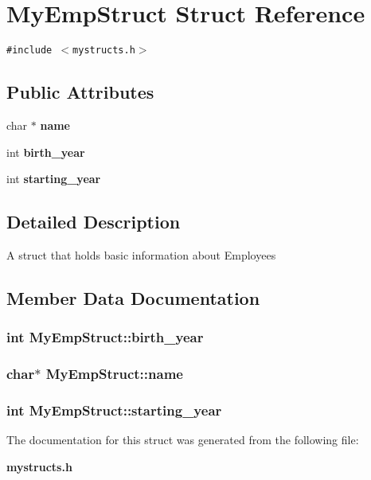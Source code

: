 \section{My\-Emp\-Struct Struct Reference}
\label{structMyEmpStruct}
{\tt \#include $<$mystructs.h$>$}

\subsection*{Public Attributes}
\begin{CompactItemize}
\item 
char $\ast$ \bf{name}
\item 
int \bf{birth\_\-year}
\item 
int \bf{starting\_\-year}
\end{CompactItemize}


\subsection{Detailed Description}
A struct that holds basic information about Employees 



\subsection{Member Data Documentation}
\subsubsection{\setlength{\rightskip}{0pt plus 5cm}int \bf{My\-Emp\-Struct::birth\_\-year}}\label{structMyEmpStruct_522685b85b9f3f784f9c16226c2d92a0}


\subsubsection{\setlength{\rightskip}{0pt plus 5cm}char$\ast$ \bf{My\-Emp\-Struct::name}}\label{structMyEmpStruct_dd70d4f719cdcb89f0560236aebfbbdf}


\subsubsection{\setlength{\rightskip}{0pt plus 5cm}int \bf{My\-Emp\-Struct::starting\_\-year}}\label{structMyEmpStruct_f4af355598895048df3d4806b448d0fd}




The documentation for this struct was generated from the following file:\begin{CompactItemize}
\item 
\bf{mystructs.h}\end{CompactItemize}
